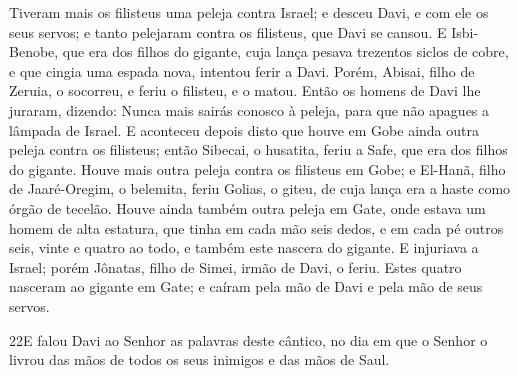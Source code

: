 Tiveram mais os filisteus uma peleja contra Israel; e desceu
Davi, e com ele os seus servos; e tanto pelejaram contra os
filisteus, que Davi se cansou. E Isbi-Benobe, que era dos
filhos do gigante, cuja lança pesava trezentos siclos de cobre, e
que cingia uma espada nova, intentou ferir a Davi. Porém,
Abisai, filho de Zeruia, o socorreu, e feriu o filisteu, e o matou.
Então os homens de Davi lhe juraram, dizendo: Nunca mais sairás
conosco à peleja, para que não apagues a lâmpada de Israel. E
aconteceu depois disto que houve em Gobe ainda outra peleja contra
os filisteus; então Sibecai, o husatita, feriu a Safe, que era dos
filhos do gigante. Houve mais outra peleja contra os
filisteus em Gobe; e El-Hanã, filho de Jaaré-Oregim, o belemita,
feriu Golias, o giteu, de cuja lança era a haste como órgão de
tecelão. Houve ainda também outra peleja em Gate, onde estava
um homem de alta estatura, que tinha em cada mão seis dedos, e em
cada pé outros seis, vinte e quatro ao todo, e também este nascera
do gigante. E injuriava a Israel; porém Jônatas, filho de
Simei, irmão de Davi, o feriu. Estes quatro nasceram ao
gigante em Gate; e caíram pela mão de Davi e pela mão de seus
servos.

\medskip

\lettrine{22} E falou Davi ao Senhor as palavras deste
cântico, no dia em que o Senhor o livrou das mãos de todos os seus
inimigos e das mãos de Saul.

